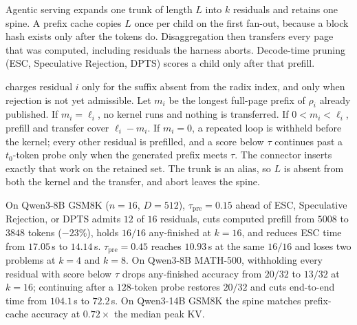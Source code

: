 Agentic serving expands one trunk of length $L$ into $k$ residuals and retains one spine.
A prefix cache copies $L$ once per child on the first fan-out, because a block hash exists only after the tokens do.
Disaggregation then transfers every page that was computed, including residuals the harness aborts.
Decode-time pruning (ESC, Speculative Rejection, DPTS) scores a child only after that prefill.

\sys charges residual $i$ only for the suffix absent from the radix index, and only when rejection is not yet admissible.
Let $m_i$ be the longest full-page prefix of $\rho_i$ already published.
If $m_i=\ell_i$, no kernel runs and nothing is transferred.
If $0<m_i<\ell_i$, prefill and transfer cover $\ell_i-m_i$.
If $m_i=0$, a repeated loop is withheld before the kernel; every other residual is prefilled, and a score below $\tau$ continues past a $t_0$-token probe only when the generated prefix meets $\tau$.
The connector inserts exactly that work on the retained set.
The trunk is an alias, so $L$ is absent from both the kernel and the transfer, and abort leaves the spine.

On Qwen3-8B GSM8K ($n{=}16$, $D{=}512$), $\tau_{\mathrm{pre}}{=}0.15$ ahead of ESC, Speculative Rejection, or DPTS admits $12$ of $16$ residuals, cuts computed prefill from $5008$ to $3848$ tokens ($-23\%$), holds $16/16$ any-finished at $k{=}16$, and reduces ESC time from $17.05$\,s to $14.14$\,s.
$\tau_{\mathrm{pre}}{=}0.45$ reaches $10.93$\,s at the same $16/16$ and loses two problems at $k{=}4$ and $k{=}8$.
On Qwen3-8B MATH-500, withholding every residual with score below $\tau$ drops any-finished accuracy from $20/32$ to $13/32$ at $k{=}16$; continuing after a $128$-token probe restores $20/32$ and cuts end-to-end time from $104.1$\,s to $72.2$\,s.
On Qwen3-14B GSM8K the spine matches prefix-cache accuracy at $0.72\times$ the median peak KV.
